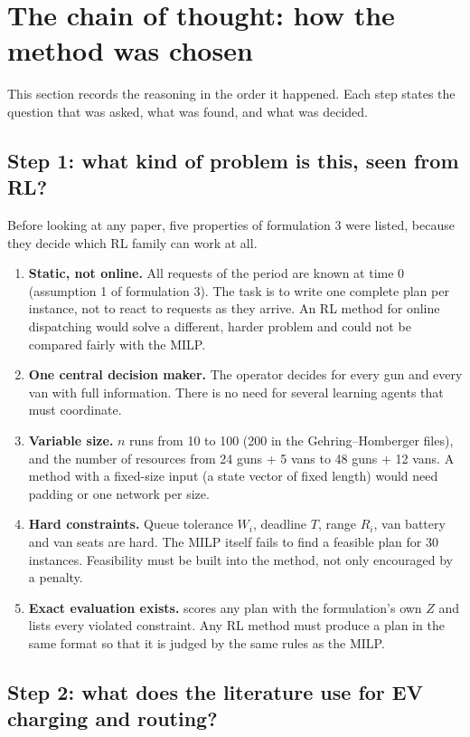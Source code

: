 \section{The chain of thought: how the method was chosen}
\label{sec:chain}

This section records the reasoning in the order it happened. Each step states the question that was asked, what was found, and what was decided.

\subsection{Step 1: what kind of problem is this, seen from RL?}

Before looking at any paper, five properties of formulation 3 were listed, because they decide which RL family can work at all.
\begin{enumerate}
  \item \textbf{Static, not online.} All requests of the period are known at time 0 (assumption 1 of formulation 3). The task is to write one complete plan per instance, not to react to requests as they arrive. An RL method for online dispatching would solve a different, harder problem and could not be compared fairly with the MILP.
  \item \textbf{One central decision maker.} The operator decides for every gun and every van with full information. There is no need for several learning agents that must coordinate.
  \item \textbf{Variable size.} $n$ runs from 10 to 100 (200 in the Gehring--Homberger files), and the number of resources from 24 guns + 5 vans to 48 guns + 12 vans. A method with a fixed-size input (a state vector of fixed length) would need padding or one network per size.
  \item \textbf{Hard constraints.} Queue tolerance $W_i$, deadline $T$, range $R_i$, van battery and van seats are hard. The MILP itself fails to find a feasible plan for 30 instances. Feasibility must be built into the method, not only encouraged by a penalty.
  \item \textbf{Exact evaluation exists.}  scores any plan with the formulation's own $Z$ and lists every violated constraint. Any RL method must produce a plan in the same format so that it is judged by the same rules as the MILP.
\end{enumerate}

\subsection{Step 2: what does the literature use for EV charging and routing?}

